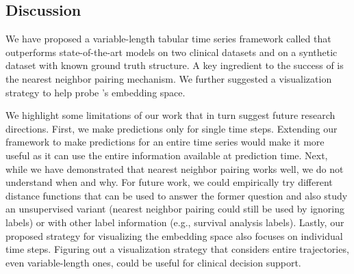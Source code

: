 \subsection{Discussion}

We have proposed a variable-length tabular time series framework called  that outperforms state-of-the-art models on two clinical datasets and on a synthetic dataset with known ground truth structure.
A key ingredient to the success of  is the nearest neighbor pairing mechanism. 
We further suggested a visualization strategy to help probe 's embedding space.

We highlight some limitations of our work that in turn suggest future research directions.
First, we make predictions only for single time steps.
Extending our framework to make predictions for an entire time series would make it more useful as it can use the entire information available at prediction time.
Next, while we have demonstrated that nearest neighbor pairing works well, we do not understand when and why.
For future work, we could empirically try different distance functions that can be used to answer the former question and also study an unsupervised  variant (nearest neighbor pairing could still be used by ignoring labels) or  with other label information (e.g., survival analysis labels).
Lastly, our proposed strategy for visualizing the embedding space also focuses on individual time steps.
Figuring out a visualization strategy that considers entire trajectories, even variable-length ones, could be useful for clinical decision support.


